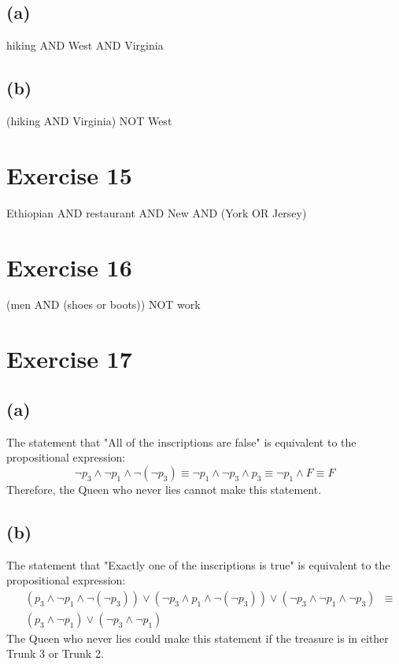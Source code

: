 \documentclass{article}
\begin{document}
\subsection{(a)}
hiking AND West AND Virginia
\subsection{(b)}
(hiking AND Virginia) NOT West

\pagebreak

\section{Exercise 15}
Ethiopian AND restaurant AND New AND (York OR Jersey)

\pagebreak

\section{Exercise 16}
(men AND (shoes or boots)) NOT work

\pagebreak

\section{Exercise 17}
\subsection{(a)}
The statement that "All of the inscriptions are false" is equivalent to the propositional expression:
\[
	\neg p_3 \land \neg p_1 \land \neg (\neg p_3) \equiv \neg p_1 \land \neg p_3 \land p_3 \equiv \neg p_1 \land F \equiv F
\]
Therefore, the Queen who never lies cannot make this statement.

\subsection{(b)}
The statement that "Exactly one of the inscriptions is true" is equivalent to the propositional expression:
\begin{align*}
	 & (p_3 \land \neg p_1 \land \neg (\neg p_3)) \lor (\neg p_3 \land p_1 \land \neg (\neg p_3)) \lor (\neg p_3 \land \neg p_1 \land \neg p_3) & \equiv \\
	 & (p_3 \land \neg p_1) \lor (\neg p_3 \land \neg p_1)
\end{align*}
The Queen who never lies could make this statement if the treasure is in either Trunk 3 or Trunk 2.
\end{document}
